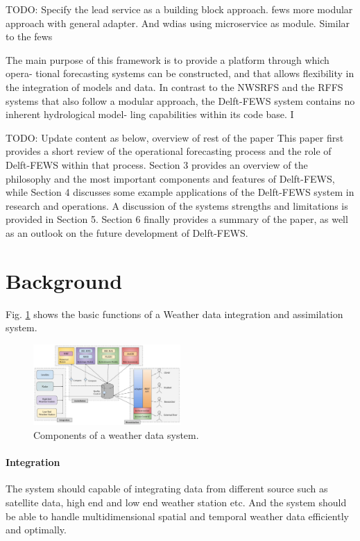 \documentclass[conference]{IEEEtran}
\newcommand{\db}[1]{\textcolor{blue!40}{#1}}
\begin{document}
TODO: Specify the \acrshort{lead} service as a building block approach. \acrshort{fews} more modular approach with general adapter. And \acrshort{wdias} using microservice as module.
Similar to the \acrfull{fews} \cite{Werner2013TheSystem} 

The main purpose of this framework is to provide a platform through which opera- tional forecasting systems can be constructed, and that allows flexibility in the integration of models and data. In contrast to the NWSRFS and the RFFS systems that also follow a modular approach, the Delft-FEWS system contains no inherent hydrological model- ling capabilities within its code base. I

TODO: Update content as below, overview of rest of the paper
This paper first provides a short review of the operational forecasting process and the role of Delft-FEWS within that process. Section 3 provides an overview of the philosophy and the most important components and features of Delft-FEWS, while Section 4 discusses some example applications of the Delft-FEWS system in research and operations. A discussion of the systems strengths and limitations is provided in Section 5. Section 6 finally provides a summary of the paper, as well as an outlook on the future development of Delft-FEWS.
\section{\db{Background}}
Fig. \ref{fi:wdia_components} shows the basic functions of a Weather data integration and assimilation system.
\begin{figure}[htbp]
\centerline{\includegraphics[width=0.5\textwidth]{method/misc/weather_data_system_components.jpg}}
\caption{Components of a weather data system.}
\label{fi:wdia_components}
\end{figure}
\paragraph{Integration} The system should capable of integrating data from different source such as satellite data, high end and low end weather station etc. And the system should be able to handle multidimensional spatial and temporal weather data efficiently and optimally. 
\end{document}
